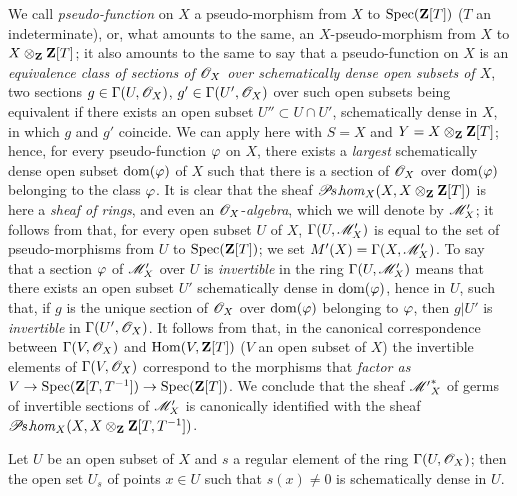 \begin{env}[20.2.8]\label{IV.20.2.8}
We call \emph{pseudo-function} on $X$ a pseudo-morphism from $X$ to $\operatorname{Spec}(\mathbf{Z}[T])$ ($T$ an indeterminate), or, what amounts to the same, an $X$-pseudo-morphism from $X$ to $X\otimes_{\mathbf{Z}}\mathbf{Z}[T]$; it also amounts to the same  to say that a pseudo-function on $X$ is an \emph{equivalence class of sections of $\mathscr{O}_X$ over schematically dense open subsets of $X$}, two sections $g\in\Gamma(U,\mathscr{O}_X)$, $g'\in\Gamma(U',\mathscr{O}_X)$ over such open subsets being equivalent if there exists an open subset $U''\subset U\cap U'$, schematically dense in $X$, in which $g$ and $g'$ coincide.
We can apply  here with $S=X$ and $Y=X\otimes_{\mathbf{Z}}\mathbf{Z}[T]$; hence, for every pseudo-function $\varphi$ on $X$, there exists a \emph{largest} schematically dense open subset $\operatorname{dom}(\varphi)$ of $X$ such that there is a section of $\mathscr{O}_X$ over $\operatorname{dom}(\varphi)$ belonging to the class $\varphi$.
It is clear that the sheaf $\mathscr{P}\!s.\!\mathit{hom}_X(X,X\otimes_{\mathbf{Z}}\mathbf{Z}[T])$ is here a \emph{sheaf of rings}, and even an $\mathscr{O}_X$-\emph{algebra}, which we will denote by $\mathscr{M}'_X$; it follows from  that, for every open subset $U$ of $X$, $\Gamma(U,\mathscr{M}'_X)$ is equal to the set of pseudo-morphisms from $U$ to $\operatorname{Spec}(\mathbf{Z}[T])$; we set $M'(X)=\Gamma(X,\mathscr{M}'_X)$.
To say that a section $\varphi$ of $\mathscr{M}'_X$ over $U$ is \emph{invertible} in the ring $\Gamma(U,\mathscr{M}'_X)$ means that there exists an open subset $U'$ schematically dense in $\operatorname{dom}(\varphi)$, hence in $U$, such that, if $g$ is the unique section of $\mathscr{O}_X$ over $\operatorname{dom}(\varphi)$ belonging to $\varphi$, then $g|U'$ is \emph{invertible} in $\Gamma(U',\mathscr{O}_X)$.
It follows from  that, in the canonical correspondence between $\Gamma(V,\mathscr{O}_X)$ and $\operatorname{Hom}(V,\mathbf{Z}[T])$ ($V$ an open subset of $X$) the invertible elements of $\Gamma(V,\mathscr{O}_X)$ correspond to the morphisms that
\emph{factor as} $V\to\operatorname{Spec}(\mathbf{Z}[T,T^{-1}])\to\operatorname{Spec}(\mathbf{Z}[T])$.
We conclude that the sheaf ${\mathscr{M}'}^*_X$ of germs of invertible sections of $\mathscr{M}'_X$ is canonically identified with the sheaf $\mathscr{P}\!s.\!\mathit{hom}_X(X,X\otimes_{\mathbf{Z}}\mathbf{Z}[T,T^{-1}])$.
\end{env}

\begin{lemma}[20.2.9]
\label{IV.20.2.9}
Let $U$ be an open subset of $X$ and $s$ a regular element of the ring $\Gamma(U,\mathscr{O}_X)$; then the open set $U_s$ of points $x\in U$ such that $s(x)\neq0$ is schematically dense in $U$.
\end{lemma}

